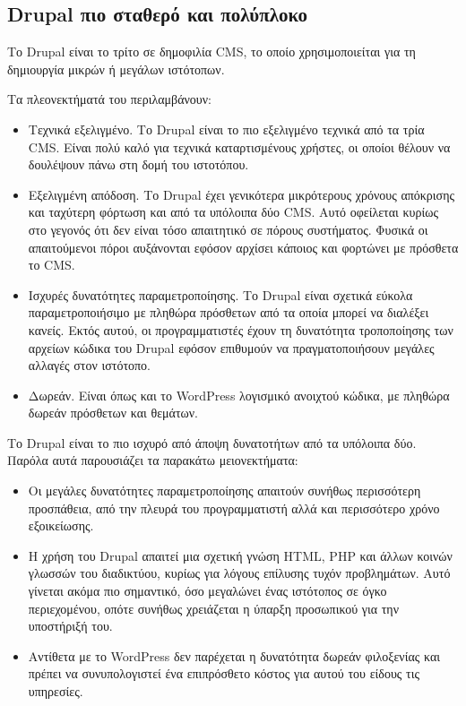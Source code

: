 \documentclass[12pt]{report}
\begin{document}
\subsection{\textlatin{Drupal} πιο σταθερό και πολύπλοκο}
Το \textlatin{Drupal} είναι το τρίτο σε δημοφιλία \textlatin{CMS}, το οποίο χρησιμοποιείται για τη δημιουργία μικρών ή μεγάλων ιστότοπων.

Τα πλεονεκτήματά του περιλαμβάνουν:
\begin{itemize}
\item Τεχνικά εξελιγμένο. Το \textlatin{Drupal} είναι το πιο εξελιγμένο τεχνικά από τα τρία \textlatin{CMS}. Είναι πολύ καλό για τεχνικά καταρτισμένους χρήστες, οι οποίοι θέλουν να δουλέψουν πάνω στη δομή του ιστοτόπου.
\item Εξελιγμένη απόδοση. Το \textlatin{Drupal} έχει γενικότερα μικρότερους χρόνους απόκρισης και ταχύτερη φόρτωση και από τα υπόλοιπα δύο \textlatin{CMS}. Αυτό οφείλεται κυρίως στο γεγονός ότι δεν είναι τόσο απαιτητικό σε πόρους συστήματος. Φυσικά οι απαιτούμενοι πόροι αυξάνονται εφόσον αρχίσει κάποιος και φορτώνει με πρόσθετα το \textlatin{CMS}.
\item Ισχυρές δυνατότητες παραμετροποίησης. Το \textlatin{Drupal} είναι σχετικά εύκολα παραμετροποιήσιμο με πληθώρα πρόσθετων από τα οποία μπορεί να διαλέξει κανείς. Εκτός αυτού, οι προγραμματιστές έχουν τη δυνατότητα τροποποίησης των αρχείων κώδικα του \textlatin{Drupal} εφόσον επιθυμούν να πραγματοποιήσουν μεγάλες αλλαγές στον ιστότοπο.
\item Δωρεάν. Είναι όπως και το \textlatin{WordPress} λογισμικό ανοιχτού κώδικα, με πληθώρα δωρεάν πρόσθετων και θεμάτων.
\end{itemize}

Το \textlatin{Drupal} είναι το πιο ισχυρό από άποψη δυνατοτήτων από τα υπόλοιπα δύο. Παρόλα αυτά παρουσιάζει τα παρακάτω μειονεκτήματα:
\begin{itemize}
\item Οι μεγάλες δυνατότητες παραμετροποίησης απαιτούν συνήθως περισσότερη προσπάθεια, από την πλευρά του προγραμματιστή αλλά και περισσότερο χρόνο εξοικείωσης.
\item Η χρήση του \textlatin{Drupal} απαιτεί μια σχετική γνώση \textlatin{HTML, PHP} και άλλων κοινών γλωσσών του διαδικτύου, κυρίως για λόγους επίλυσης τυχόν προβλημάτων. Αυτό γίνεται ακόμα πιο σημαντικό, όσο μεγαλώνει ένας ιστότοπος σε όγκο περιεχομένου, οπότε συνήθως χρειάζεται η ύπαρξη προσωπικού για την υποστήριξή του.
\item Αντίθετα με το \textlatin{WordPress} δεν παρέχεται η δυνατότητα δωρεάν φιλοξενίας και πρέπει να συνυπολογιστεί ένα επιπρόσθετο κόστος για αυτού του είδους τις υπηρεσίες.
\end{itemize}
\end{document}
